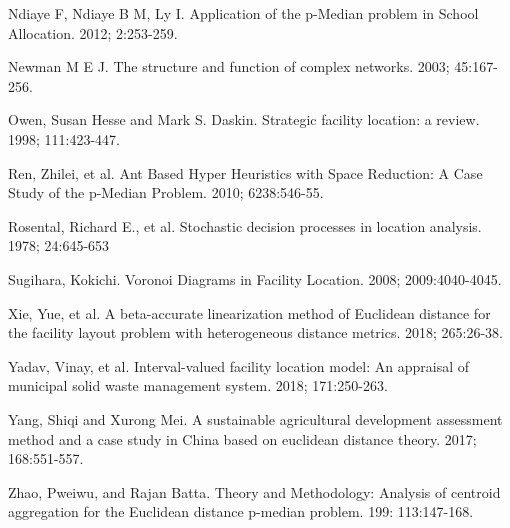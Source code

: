 \documentclass[twoside,twocolumn]{article}
\begin{document}
\begin{thebibliography}{99}
Ndiaye F, Ndiaye B M, Ly I.
\newblock Application of the p-Median problem in School Allocation.
 2012; 2:253-259.

Newman M E J.
\newblock The structure and function of complex networks.
 2003; 45:167-256.

Owen, Susan Hesse and Mark S. Daskin.
\newblock Strategic facility location: a review.
 1998; 111:423-447.

Ren, Zhilei, et al.
\newblock Ant Based Hyper Heuristics with Space Reduction: A Case Study of the p-Median Problem.
 2010; 6238:546-55.

Rosental, Richard E., et al.
\newblock Stochastic decision processes in location analysis.
 1978; 24:645-653

Sugihara, Kokichi.
\newblock Voronoi Diagrams in Facility Location.
 2008; 2009:4040-4045.

Xie, Yue, et al.
\newblock A beta-accurate linearization method of Euclidean distance for the facility layout problem with heterogeneous distance metrics.
 2018; 265:26-38.

Yadav, Vinay, et al.
\newblock Interval-valued facility location model: An appraisal of municipal solid waste management system.
 2018; 171:250-263.

Yang, Shiqi and Xurong Mei.
\newblock A sustainable agricultural development assessment method and a case study in China based on euclidean distance theory.
 2017; 168:551-557.

Zhao, Pweiwu, and Rajan Batta.
\newblock Theory and Methodology: Analysis of centroid aggregation for the Euclidean distance p-median problem.
 199: 113:147-168.

\end{thebibliography}
\end{document}
